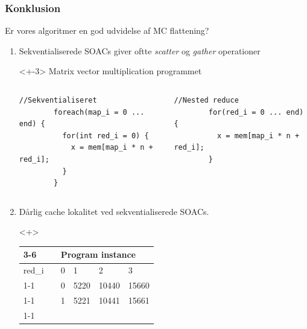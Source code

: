 \documentclass[t]{beamer}
\begin{document}
\begin{frame}[fragile]
  \frametitle{Konklusion}
  Er vores algoritmer en god udvidelse af MC flattening?
  \begin{enumerate}
    \item<+-> Sekventialiserede SOACs giver oftte \textit{scatter} og \textit{gather} operationer\\
      \begin{onlyenv}<+-3>
        Matrix vector multiplication programmet
      \begin{columns}
        \begin{column}{0.49\textwidth}
        \begin{lstlisting}[language=ispc, xleftmargin=-15mm, breaklines=false]
        //Sekventialiseret
        foreach(map_i = 0 ... end) {
          for(int red_i = 0) {
            x = mem[map_i * n + red_i];
          }
        }
\end{lstlisting}
        \end{column}
        \begin{column}{0.49\textwidth}
        \begin{lstlisting}[language=ispc, xleftmargin=-15mm, breaklines=false]
        //Nested reduce
        for(red_i = 0 ... end) {
          x = mem[map_i * n + red_i];
        }
\end{lstlisting}
          \end{column}
    \end{columns}
  \end{onlyenv}
    \item<+-> Dårlig cache lokalitet ved sekventialiserede SOACs. %
        \begin{onlyenv}<+>
        \begin{table}[]
        \begin{tabular}{ll|llll|}
        \cline{3-6}
                                     &  & \multicolumn{4}{l|}{Program instance}                                                    \\ \hline
        \multicolumn{1}{|l|}{red\_i} &  & \multicolumn{1}{l|}{0} & \multicolumn{1}{l|}{1}    & \multicolumn{1}{l|}{2}      & 3     \\ \cline{1-1} \cline{3-6}
        \multicolumn{1}{|l|}{0}      &  & \multicolumn{1}{l|}{0} & \multicolumn{1}{l|}{5220} & \multicolumn{1}{l|}{10440}  & 15660 \\ \cline{1-1} \cline{3-6}
        \multicolumn{1}{|l|}{1}      &  & \multicolumn{1}{l|}{1} & \multicolumn{1}{l|}{5221} & \multicolumn{1}{l|}{10441}  & 15661 \\ \cline{1-1} \cline{3-6}

\end{tabular}
\end{table}
\end{onlyenv}
\end{enumerate}
\end{frame}
\end{document}
